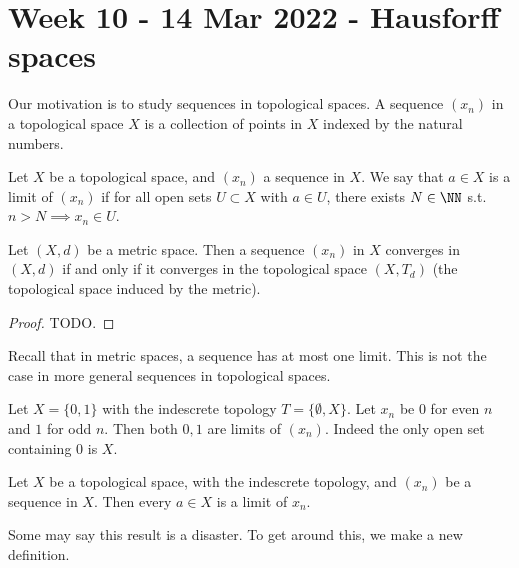 \section{Week 10 - 14 Mar 2022 - Hausforff spaces}
Our motivation is to study sequences in topological spaces. A sequence $(x_n)$
in a topological space $X$ is a collection of points in $X$ indexed by the
natural numbers.
\begin{definition}
  Let $X$ be a topological space, and $(x_n)$ a sequence in $X$. We say that
  $a\in X$ is a limit of $(x_n)$ if for all open sets $U\subset X$ with $a\in
  U$, there exists $N\in\NN$ s.t. $n>N \implies x_n\in U$.
  \label{def:sequenceConvergesTopoSpace}
\end{definition}

\begin{lemma}
  Let $(X,d)$ be a metric space. Then a sequence $(x_n)$ in $X$ converges in
  $(X,d)$ if and only if it converges in the topological space $(X,T_d)$ (the
  topological space induced by the metric).
  \label{lem:convergenceMetricSpaceTopo}
\end{lemma}
\begin{proof}
  TODO.
\end{proof}

Recall that in metric spaces, a sequence has at most one limit. This is not the
case in more general sequences in topological spaces.

\begin{example}
  Let $X=\{0,1\}$ with the indescrete topology $T=\{\emptyset, X\}$. Let $x_n$
  be $0$ for even $n$ and $1$ for odd $n$. Then both $0,1$ are limits of
  $(x_n)$. Indeed the only open set containing $0$ is $X$.
\end{example}
\begin{proposition}
  Let $X$ be a topological space, with the indescrete topology, and $(x_n)$ be a
  sequence in $X$. Then every $a\in X$ is a limit of $x_n$.
  \label{prop:limitPointsTopoSpace}
\end{proposition}

Some may say this result is a disaster. To get around this, we make a new
definition.

